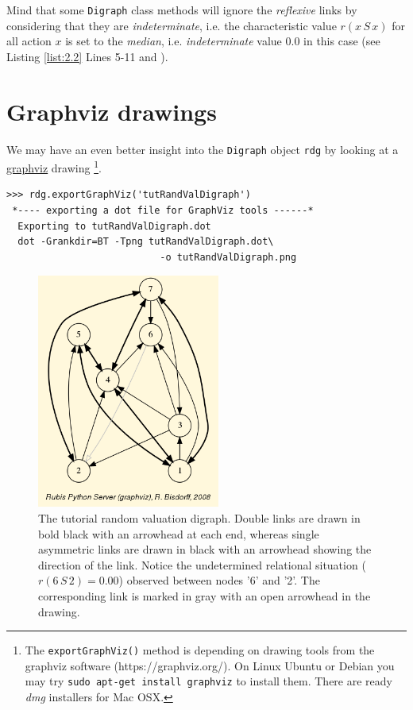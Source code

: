 Mind that some \texttt{Digraph} class methods will ignore the \emph{reflexive} links by considering that they are \emph{indeterminate}, i.e. the characteristic value $r(x\,S\,x)$ for all action $x$ is set to the \emph{median}, i.e. \emph{indeterminate} value $0.0$ in this case (see Listing \ref{list:2.2} Lines 5-11 and \citet{BIS-2004a}).

\section{Graphviz drawings}
\label{sec:2.2}

We may have an even better insight into the \texttt{Digraph} object \texttt{rdg} by looking at a \href{https://graphviz.org/}{graphviz} drawing \footnote{The \texttt{exportGraphViz()} method is depending on drawing tools from the graphviz software (https://graphviz.org/). On Linux Ubuntu or Debian you may try \texttt{sudo apt-get install graphviz} to install them. There are ready \emph{dmg} installers for Mac OSX.}.
\begin{lstlisting}
>>> rdg.exportGraphViz('tutRandValDigraph')
 *---- exporting a dot file for GraphViz tools ------*
  Exporting to tutRandValDigraph.dot
  dot -Grankdir=BT -Tpng tutRandValDigraph.dot\
                           -o tutRandValDigraph.png
\end{lstlisting}
\begin{figure}[h]
\sidecaption[t]
\includegraphics[width=6cm]{Figures/tutRandValDigraph.png}
\caption{The tutorial random valuation digraph. Double links are drawn in bold black with an arrowhead at each end, whereas single asymmetric links are drawn in black with an arrowhead showing the direction of the link. Notice the undetermined relational situation ($r(6\,S\,2) = 0.00$) observed between nodes '6' and '2'. The corresponding link is marked in gray with an open arrowhead in the drawing.}
\label{fig:2.1}       %
\end{figure}
  
